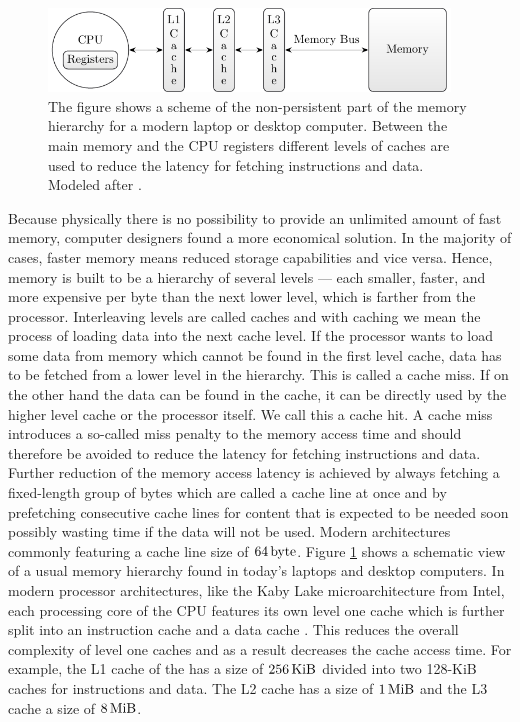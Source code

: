 \documentclass{stdlocal}
\begin{document}
    \begin{figure}
      \center
      \includegraphics[width=0.95\textwidth]{figures/memory_hierarchy.pdf}
      \caption[Memory Hierarchy]{%
        The figure shows a scheme of the non-persistent part of the memory hierarchy for a modern laptop or desktop computer.
        Between the main memory and the CPU registers different levels of caches are used to reduce the latency for fetching instructions and data.
        Modeled after \textcite[\pno~79]{hennessy2019}.
      }
      \label{fig:memory-hierarchy}
    \end{figure}

    Because physically there is no possibility to provide an unlimited amount of fast memory, computer designers found a more economical solution.
    In the majority of cases, faster memory means reduced storage capabilities and vice versa.
    Hence, memory is built to be a hierarchy of several levels --- each smaller, faster, and more expensive per byte than the next lower level, which is farther from the processor.
    Interleaving levels are called caches and with caching we mean the process of loading data into the next cache level.
    If the processor wants to load some data from memory which cannot be found in the first level cache, data has to be fetched from a lower level in the hierarchy.
    This is called a cache miss.
    If on the other hand the data can be found in the cache, it can be directly used by the higher level cache or the processor itself.
    We call this a cache hit.
    A cache miss introduces a so-called miss penalty to the memory access time and should therefore be avoided to reduce the latency for fetching instructions and data.
    Further reduction of the memory access latency is achieved by always fetching a fixed-length group of bytes which are called a cache line at once and by prefetching consecutive cache lines for content that is expected to be needed soon possibly wasting time if the data will not be used.
    Modern architectures commonly featuring a cache line size of $64\, \mathrm{byte}$.
    Figure \ref{fig:memory-hierarchy} shows a schematic view of a usual memory hierarchy found in today's laptops and desktop computers.
    In modern processor architectures, like the Kaby Lake microarchitecture from Intel, each processing core of the CPU features its own level one cache which is further split into an instruction cache and a data cache \autocite{intel-kaby-lake}.
    This reduces the overall complexity of level one caches and as a result decreases the cache access time.
    For example, the L1 cache of the  has a size of $256\, \mathrm{KiB}$ divided into two 128-KiB caches for instructions and data.
    The L2 cache has a size of $1\, \mathrm{MiB}$ and the L3 cache a size of $8\, \mathrm{MiB}$.
    \autocites[\ppno~78-83]{hennessy2019}{intel-kaby-lake-i7}{intel-kaby-lake}
\end{document}
